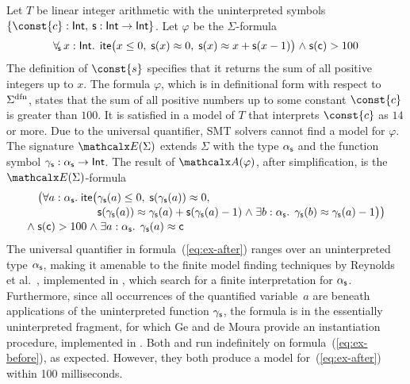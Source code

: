 
\begin{example}
\label{ex:translation}
Let $T$ be linear integer arithmetic
with the uninterpreted symbols  $\{ \const{c} : { \typeint },\allowbreak\> \con{s} : { \typeint \rightarrow \typeint } \}$.
Let $\varphi$ be the $\Sigma$-formula
\begin{equation} \label{eq:ex-before}
\forallf{\con{s}} x : {\typeint}.\;\, \lite\bigl( x \leq 0,\; \con{s}(x) \teq 0,\;
  \con{s}( x ) \teq x + \con{s}( x - 1 ) \bigr) \wedge \con{s}( \con{c} ) > 100
\end{equation}
%
The definition of $\const{s}$ specifies that it returns the sum of all
positive integers up to $x$. The formula $\varphi$, which is in definitional form with
respect to $\sfundefs{\Sigma}$,
states that the sum of all
positive numbers up to some constant $\const{c}$ is greater than $100$. It is
satisfied in a model of $T$ that interprets $\const{c}$ as $14$ or more.
Due to the universal quantifier, SMT solvers
cannot find
a model for $\varphi$. The signature $\extendsig{\Sigma}$ extends $\Sigma$ with the type
$\alpha_{\mathsf{s}}$ and the %
function symbol $\gamma_{\mathsf{s}} : \alpha_{\mathsf{s}}
\rightarrow \mathsf{Int}$. The result of $\conv( \varphi )$, after simplification,
is the $\extendsig{\Sigma}$-formula
%
\begin{equation} \label{eq:ex-after}
\!\begin{aligned}[c]
  & \phantom{{\wedge}\; }\bigl(
      \forall a : \fargtype{\con{s}}.\; \lite\bigl(
        \!\begin{aligned}[t]
         &  \farg{\con{s}}( a ) \leq 0,\;
          \con{s}(\farg{\con{s}}( a )) \teq 0,\;
\\[-\jot]
  & \con{s}(\farg{\con{s}}( a )) \teq \farg{\con{s}}( a ) + \con{s}( \farg{\con{s}}( a )-1 )
    \wedge \exists b : {\fargtype{\con{s}}}.\;\, \farg{\con{s}}( b ) \teq \farg{\con{s}}( a )-1 \bigr) \bigr)
\end{aligned}
\\[-\jot]
 & {\wedge}\; \con{s}( \con{c} ) > 100 \wedge \exists a : {\fargtype{\con{s}}}.\;\, \farg{\con{s}}( a ) \teq \con{c}
\end{aligned}
\end{equation}
%
The universal quantifier in formula~(\ref{eq:ex-after}) ranges over an uninterpreted
type $\alpha_{\mathsf{s}}$, making it amenable to the finite model finding
techniques by Reynolds et al.\ \cite{ReyEtAl-1-RR-13,reynolds-et-al-2013},
implemented in \cvc, which search for a finite interpretation for $\alpha_{\mathsf{s}}$.
Furthermore, since all occurrences of the quantified variable~$a$ are
beneath applications of the uninterpreted function $\gamma_{\mathsf{s}}$,
the formula is in the essentially uninterpreted fragment,
for which Ge and de Moura \cite{GeDeM-CAV-09} provide
an instantiation procedure, implemented in \ziii.
Both \cvc and \ziii run indefinitely on formula~(\ref{eq:ex-before}), as expected.
However, they both produce a model for~(\ref{eq:ex-after}) within 100 milliseconds.\xend
\end{example}

